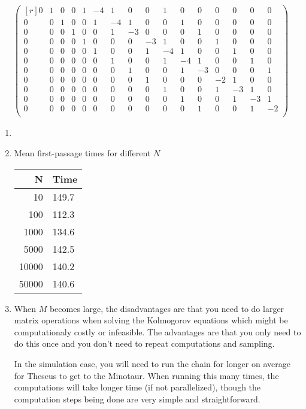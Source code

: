 \documentclass[12pt]{article}
\theoremstyle{plain}
\theoremstyle{definition}
\theoremstyle{remark}
\begin{document}
\begin{enumerate}
\begin{align*}
\begin{pmatrix}[r]
          0 & 1 & 0 & 0 & 1 &-4 & 1 & 0 & 0 & 1 & 0 & 0 & 0 & 0 & 0 & 0 \\
          0 & 0 & 1 & 0 & 0 & 1 &-4 & 1 & 0 & 0 & 1 & 0 & 0 & 0 & 0 & 0 \\
          0 & 0 & 0 & 1 & 0 & 0 & 1 & -3& 0 & 0 & 0 & 1 & 0 & 0 & 0 & 0 \\
          0 & 0 & 0 & 0 & 1 & 0 & 0 & 0 & -3 & 1 & 0 & 0 & 1 & 0 & 0 & 0 \\
          0 & 0 & 0 & 0 & 0 & 1 & 0 & 0 & 1  & -4 & 1 & 0 & 0 & 1 & 0 & 0 \\
          0 & 0 & 0 & 0 & 0 & 0 & 1 & 0 & 0  & 1  &-4 & 1 & 0 & 0 & 1 & 0 \\
          0 & 0 & 0 & 0 & 0 & 0 & 0 & 1 & 0  & 0  & 1 &-3 & 0 & 0 & 0 & 1 \\
          0 & 0 & 0 & 0 & 0 & 0 & 0 & 0 & 1  & 0  & 0 & 0 & -2 & 1 & 0 & 0 \\
          0 & 0 & 0 & 0 & 0 & 0 & 0 & 0 & 0  & 1  & 0 & 0 &  1 & -3 & 1 & 0 \\
          0 & 0 & 0 & 0 & 0 & 0 & 0 & 0 & 0  & 0  & 1 & 0 &  0 &  1 &-3 & 1 \\
          0 & 0 & 0 & 0 & 0 & 0 & 0 & 0 & 0  & 0  & 0 & 1 &  0 &  0 & 1 & -2 \\
      \end{pmatrix}
    \end{align*}

  \begin{enumerate}
    \item 
    \item Mean first-passage times for different $N$
      \begin{table}[htpb!]
        \centering
      \begin{tabular}{r|l}
        N & Time \\\hline\hline
        10 & 149.7\\
        100& 112.3\\
        1000& 134.6\\
        5000& 142.5\\
        10000& 140.2\\
        50000& 140.6 \\
      \end{tabular}
      \end{table}

    \item When $M$ becomes large, the disadvantages are that you need to
      do larger matrix operations when solving the Kolmogorov equations
      which might be computationaly costly or infeasible. The advantages
      are that you only need to do this once and you don't need to
      repeat computations and sampling.

      In the simulation case, you will need to run the chain for longer
      on average for Theseus to get to the Minotaur. When running this
      many times, the computations will take longer time (if not
      parallelized), though the computation steps being done are very
      simple and straightforward.
  \end{enumerate}

\end{enumerate}



\end{document}
